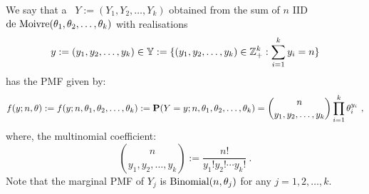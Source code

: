 \begin{model}\label{M:Multinomial}
We say that a \rv~$Y:=(Y_1,Y_2,\ldots,Y_k)$ obtained from the sum of $n$ IID $\mbox{{\rm de~Moivre}}(\theta_1,\theta_2,\ldots,\theta_k)$  with realisations
$$y:=(y_1,y_2,\ldots,y_k) \in \mathbb{Y}:= \{(y_1,y_2,\ldots,y_k) \in \mathbb{Z}_+^k : \sum_{i=1}^k y_i = n\}$$ has the PMF given by:
\[
f(y;n,\theta) := f(y;n,\theta_1,\theta_2,\ldots,\theta_k) := \mathbf{P}(Y=y;n,\theta_1,\theta_2,\ldots,\theta_k) = \binom{n}{y_1,y_2,\ldots,y_k} \prod_{i=1}^k \theta_i^{y_i} \ ,
\]
where, the multinomial coefficient:
\[
 \binom{n}{y_1,y_2,\ldots,y_k} := \frac{n!}{y_1! y_2! \cdots y_k!} \ .
\]
Note that the marginal PMF of $Y_j$ is $\mbox{{\rm Binomial}}(n,\theta_j)$ for any $j=1,2,\ldots,k$.
\end{model}


